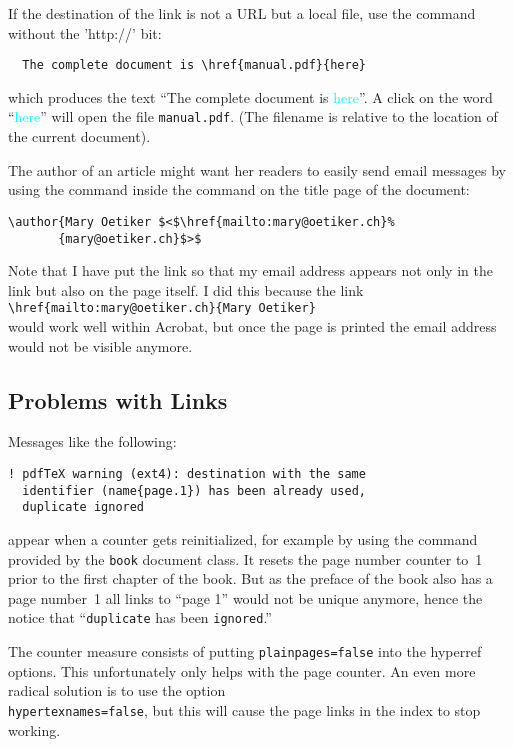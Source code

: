 If the destination of the link is not a URL but a local file,
  use the  command without the 'http://' bit:
\begin{verbatim}
  The complete document is \href{manual.pdf}{here}
\end{verbatim}
which produces the text ``The complete document is \textcolor{cyan}{here}''.
A click on the word
``\textcolor{cyan}{here}''
will open the file \texttt{manual.pdf}. (The filename is relative to
the location of the current document).

The author of an article might want her readers to easily send
  email messages by using the  command inside the 
  command on the title page of the document:
\begin{code}
\begin{verbatim}
\author{Mary Oetiker $<$\href{mailto:mary@oetiker.ch}%
       {mary@oetiker.ch}$>$
\end{verbatim}
\end{code}
Note that I have put the link so that my email address appears not only
in the link but also on the page itself. I did this because the
link\\
\verb+\href{mailto:mary@oetiker.ch}{Mary Oetiker}+\\
would
work well within Acrobat, but once the page is printed the email address
would not be visible anymore.


\subsection{Problems with Links}

Messages like the following:
\begin{verbatim}
! pdfTeX warning (ext4): destination with the same
  identifier (name{page.1}) has been already used,
  duplicate ignored
\end{verbatim}
appear when a counter gets reinitialized, for example by using
the command  provided by the \texttt{book} document class. It
resets the page number counter to~1 prior to the first chapter of the
book. But as the preface of the book also has a page number~1 all
links to ``page 1'' would not be unique anymore, hence the notice
that ``\verb+duplicate+ has been \verb+ignored+.''

The counter measure consists of putting \texttt{plainpages=false} into
the hyperref options. This unfortunately only helps with the page
counter.
An even more radical solution is to use the option\\
\texttt{hypertexnames=false}, but this will cause the page links in
the index to stop working.

